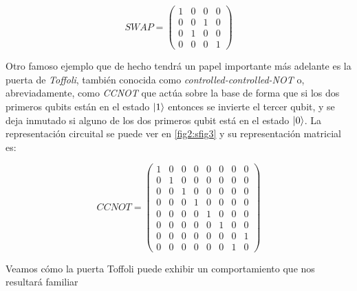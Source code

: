 \documentclass[11pt, spanish]{report}
\numberwithin{equation}{section}
\numberwithin{defin}{section}
\begin{document}
\begin{equation} 
SWAP = \begin{pmatrix}
1 & 0 & 0 & 0 \\ 0 & 0 & 1 & 0 \\ 0 & 1 & 0 & 0 \\ 0 & 0 & 0 & 1 
\end{pmatrix}
\end{equation}

Otro famoso ejemplo que de hecho tendrá un papel importante más adelante es la puerta de \emph{Toffoli}, también conocida como \emph{controlled-controlled-NOT} o, abreviadamente, como \emph{CCNOT} que actúa sobre la base de forma que si los dos primeros qubits están en el estado $\ket{1}$ entonces se invierte el tercer qubit, y se deja inmutado si alguno de los dos primeros qubit está en el estado $\ket{0}$. La representación circuital se puede ver en \ref{fig2:sfig3} y su representación matricial es:

\begin{equation}
CCNOT = \begin{pmatrix}
1 & 0 & 0 & 0 & 0 & 0 & 0 & 0 \\
0 & 1 & 0 & 0 & 0 & 0 & 0 & 0 \\
0 & 0 & 1 & 0 & 0 & 0 & 0 & 0 \\
0 & 0 & 0 & 1 & 0 & 0 & 0 & 0 \\
0 & 0 & 0 & 0 & 1 & 0 & 0 & 0 \\
0 & 0 & 0 & 0 & 0 & 1 & 0 & 0 \\
0 & 0 & 0 & 0 & 0 & 0 & 0 & 1 \\
0 & 0 & 0 & 0 & 0 & 0 & 1 & 0
\end{pmatrix}
\end{equation} 

Veamos cómo la puerta Toffoli puede exhibir un comportamiento que nos resultará familiar
\end{document}
